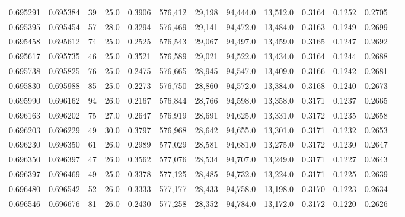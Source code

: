 \begin{tabular}{rrrrrrrrrrrrr}
0.695291 & 0.695384 &    39 & 25.0 &                                     0.3906 & 576,412 &  29,198 &  94,444.0 &  13,512.0 & 0.3164 & 0.1252 & 0.2705 \\
0.695395 & 0.695454 &    57 & 28.0 &                                     0.3294 & 576,469 &  29,141 &  94,472.0 &  13,484.0 & 0.3163 & 0.1249 & 0.2699 \\
0.695458 & 0.695612 &    74 & 25.0 &                                     0.2525 & 576,543 &  29,067 &  94,497.0 &  13,459.0 & 0.3165 & 0.1247 & 0.2692 \\
0.695617 & 0.695735 &    46 & 25.0 &                                     0.3521 & 576,589 &  29,021 &  94,522.0 &  13,434.0 & 0.3164 & 0.1244 & 0.2688 \\
0.695738 & 0.695825 &    76 & 25.0 &                                     0.2475 & 576,665 &  28,945 &  94,547.0 &  13,409.0 & 0.3166 & 0.1242 & 0.2681 \\
0.695830 & 0.695988 &    85 & 25.0 &                                     0.2273 & 576,750 &  28,860 &  94,572.0 &  13,384.0 & 0.3168 & 0.1240 & 0.2673 \\
0.695990 & 0.696162 &    94 & 26.0 &                                     0.2167 & 576,844 &  28,766 &  94,598.0 &  13,358.0 & 0.3171 & 0.1237 & 0.2665 \\
0.696163 & 0.696202 &    75 & 27.0 &                                     0.2647 & 576,919 &  28,691 &  94,625.0 &  13,331.0 & 0.3172 & 0.1235 & 0.2658 \\
0.696203 & 0.696229 &    49 & 30.0 &                                     0.3797 & 576,968 &  28,642 &  94,655.0 &  13,301.0 & 0.3171 & 0.1232 & 0.2653 \\
0.696230 & 0.696350 &    61 & 26.0 &                                     0.2989 & 577,029 &  28,581 &  94,681.0 &  13,275.0 & 0.3172 & 0.1230 & 0.2647 \\
0.696350 & 0.696397 &    47 & 26.0 &                                     0.3562 & 577,076 &  28,534 &  94,707.0 &  13,249.0 & 0.3171 & 0.1227 & 0.2643 \\
0.696397 & 0.696469 &    49 & 25.0 &                                     0.3378 & 577,125 &  28,485 &  94,732.0 &  13,224.0 & 0.3171 & 0.1225 & 0.2639 \\
0.696480 & 0.696542 &    52 & 26.0 &                                     0.3333 & 577,177 &  28,433 &  94,758.0 &  13,198.0 & 0.3170 & 0.1223 & 0.2634 \\
0.696546 & 0.696676 &    81 & 26.0 &                                     0.2430 & 577,258 &  28,352 &  94,784.0 &  13,172.0 & 0.3172 & 0.1220 & 0.2626 \\

\end{tabular}
